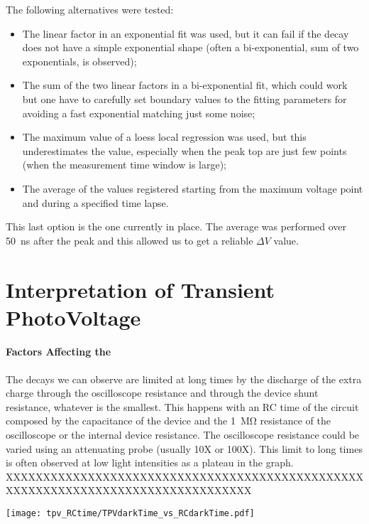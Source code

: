 	The following alternatives were tested:
	\begin{itemize}
		\item The linear factor in an exponential fit was used, but it can fail if the decay does not have a simple exponential shape (often a bi-exponential, sum of two exponentials, is observed);
		\item The sum of the two linear factors in a bi-exponential fit, which could work but one have to carefully set boundary values to the fitting parameters for avoiding a fast exponential matching just some noise;
		\item The maximum value of a \gls{loess} local regression was used, but this underestimates the value, especially when the peak top are just few points (when the measurement time window is large);
		\item The average of the values registered starting from the maximum voltage point and during a specified time lapse.
	\end{itemize}

	This last option is the one currently in place. The average was performed over \SI{50}{ns} after the peak and this allowed us to get a reliable $\Delta V$ value.

\section{Interpretation of Transient PhotoVoltage}\label{interpretation_tpv}

\paragraph{Factors Affecting the }
The decays we can observe are limited at long times by the discharge of the extra charge through the oscilloscope resistance and through the device shunt resistance, whatever is the smallest. This happens with an RC time of the circuit composed by the capacitance of the device and the \SI{1}{\Mohm} resistance of the oscilloscope or the internal device resistance. The oscilloscope resistance could be varied using an attenuating probe (usually 10X or 100X). This limit to long times is often observed at low light intensities as a plateau in the  graph. XXXXXXXXXXXXXXXXXXXXXXXXXXXXXXXXXXXXXXXXXXXXXXXXXXXXXXXXXXXXXXXXXXXXXXXXXXXXXXXXX

\begin{SCfigure}
	\centering
	\texttt{[image: tpv\_RCtime/TPVdarkTime\_vs\_RCdarkTime.pdf]}
	\label{fig:tpv_RCtime}
\end{SCfigure}

